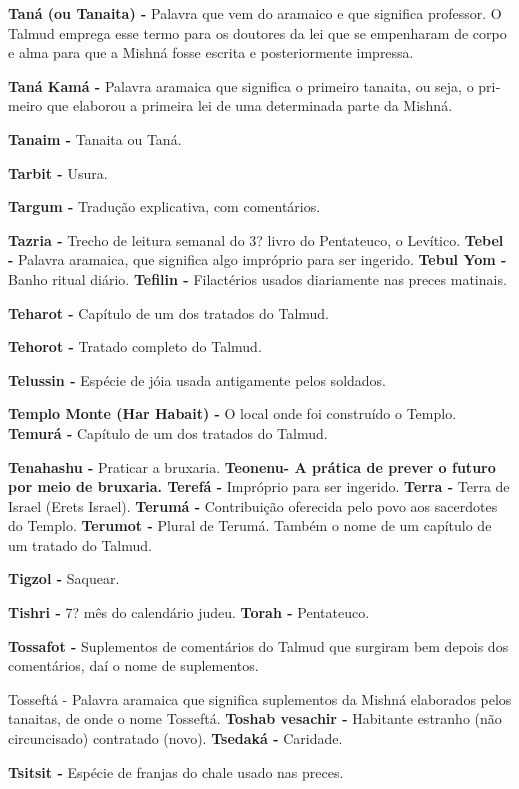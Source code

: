 \textbf{Taná (ou Tanaita) -} Palavra que vem do aramaico e que significa
professor. O Talmud emprega esse termo para os doutores da lei que se
empenharam de corpo e alma para que a Mishná fosse escrita e
posteriormente impressa.

\textbf{Taná Kamá -} Palavra aramaica que sig­nifica o primeiro tanaita,
ou seja, o pri­meiro que elaborou a primeira lei de uma determinada
parte da Mishná.

\textbf{Tanaim -} Tanaita ou Taná.

\textbf{Tarbit -} Usura.

\textbf{Targum -} Tradução explicativa, com comentários.

\textbf{Tazria -} Trecho de leitura semanal do 3? livro do Pentateuco, o
Levítico. \textbf{Tebel -} Palavra aramaica, que signifi­ca algo
impróprio para ser ingerido. \textbf{Tebul Yom -} Banho ritual diário.
\textbf{Tefilin -} Filactérios usados diariamen­te nas preces matinais.

\textbf{Teharot -} Capítulo de um dos tratados do Talmud.

\textbf{Tehorot -} Tratado completo do Tal­mud.

\textbf{Telussin -} Espécie de jóia usada anti­gamente pelos soldados.

\textbf{Templo Monte (Har Habait) -} O lo­cal onde foi construído o
Templo. \textbf{Temurá -} Capítulo de um dos tratados do Talmud.

\textbf{Tenahashu -} Praticar a bruxaria. \textbf{Teonenu- A prática de
prever o fu­turo por meio de bruxaria. Terefá -} Impróprio para ser
ingerido. \textbf{Terra -} Terra de Israel (Erets Israel).
\textbf{Terumá -} Contribuição oferecida pe­lo povo aos sacerdotes do
Templo. \textbf{Terumot -} Plural de Terumá. Também o nome de um
capítulo de um tratado do Talmud.

\textbf{Tigzol -} Saquear.

\textbf{Tishri -} 7? mês do calendário judeu. \textbf{Torah -}
Pentateuco.

\textbf{Tossafot -} Suplementos de comentá­rios do Talmud que surgiram
bem de­pois dos comentários, daí o nome de suplementos.

Tosseftá - Palavra aramaica que signifi­ca suplementos da Mishná
elaborados pelos tanaitas, de onde o nome Tosseftá. \textbf{Toshab
vesachir -} Habitante estranho (não circuncisado) contratado (novo).
\textbf{Tsedaká -} Caridade.

\textbf{Tsitsit -} Espécie de franjas do chale usado nas preces.

